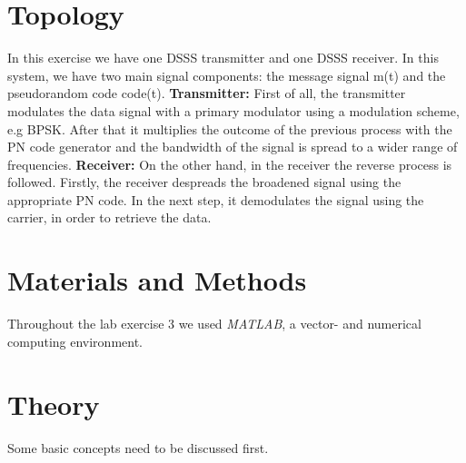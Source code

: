 \documentclass[12pt,a4paper]{article}
\begin{document}
	\section{Topology}
	In this exercise we have one DSSS transmitter and one DSSS receiver. In this system, we have two main signal components: the message signal m(t) and the pseudorandom code code(t). \newline
	\textbf{Transmitter:} First of all, the transmitter modulates the data signal with a primary modulator using a modulation scheme, e.g BPSK. After that it multiplies the outcome of the previous process with the PN code generator and the bandwidth of the signal is spread to a wider range of frequencies.
	\newline
	\textbf{Receiver:} On the other hand, in the receiver the reverse process is followed. Firstly, the receiver despreads the broadened signal using the appropriate PN code. In the next step, it demodulates the signal using the carrier, in order to retrieve the data.
	
	\section{Materials and Methods}
	Throughout the lab exercise 3 we used \emph{MATLAB}, a vector- and numerical computing environment.
	
	\section{Theory}
	Some basic concepts need to be discussed first.
\end{document}

